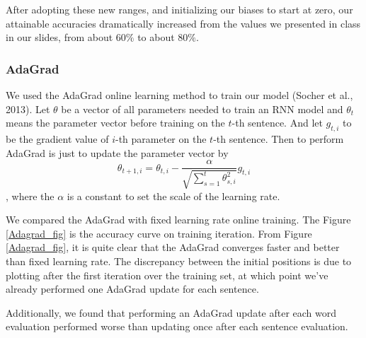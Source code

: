 \documentclass[11pt]{article}
\begin{document}
After adopting these new ranges, and initializing our biases to start at zero, our attainable accuracies dramatically increased from the values we presented in class in our slides, from about $60\%$ to about $80\%$.

\subsubsection{AdaGrad}
We used the AdaGrad online learning method to train our model (Socher et al., 2013). Let $\theta$ be a vector of all parameters needed to train an RNN model and $\theta_t$ means the parameter vector before training on the $t$-th sentence. And let $g_{t,i}$ to be the gradient value of $i$-th parameter on the $t$-th sentence. Then to perform AdaGrad is just to update the parameter vector by
$$\theta_{{t+1},i} = \theta_{{t},i}  - \frac{\alpha}{\sqrt{\sum_{s=1}^t \theta_{{s},i}^2 }} g_{t,i}$$,
where the $\alpha$ is a constant to set the scale of the learning rate.

We compared the AdaGrad with fixed learning rate online training. The Figure \ref{Adagrad_fig} is the accuracy curve on training iteration. From Figure \ref{Adagrad_fig}, it is quite clear that the AdaGrad converges faster and better than fixed learning rate. The discrepancy between the initial positions is due to plotting after the first iteration over the training set, at which point we've already performed one AdaGrad update for each sentence.

Additionally, we found that performing an AdaGrad update after each word evaluation performed worse than updating once after each sentence evaluation.
\end{document}
